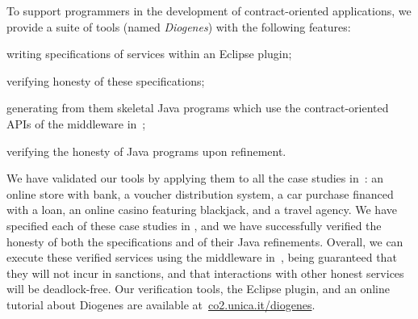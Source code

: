 To support programmers in the development of contract-oriented 
applications, we provide a suite of tools (named \emph{Diogenes}) 
with the following features:
\begin{inlinelist}
\item writing \coco specifications of services within an Eclipse plugin;
\item verifying honesty of these specifications;
\item generating from them skeletal Java programs which
use the contract-oriented APIs of the middleware in~\cite{CO2middleware}; %
\item verifying the honesty of Java programs upon refinement.
\end{inlinelist}
We have validated our tools by applying them to
all the case studies in~\cite{BMSZ15jlamp}:
an online store with bank,
a voucher distribution system,
a car purchase financed with a loan,
an online casino featuring blackjack,
and a travel agency.
We have specified each of these case studies in \coco,
and we have successfully verified the honesty of 
both the specifications and of their Java refinements.
Overall, we can execute these verified services 
using the middleware in~\cite{CO2middleware},
being guaranteed that they will not incur in sanctions,
and that interactions with other honest services will be deadlock-free.
Our verification tools, the Eclipse plugin, and an online tutorial about Diogenes
are available at~\url{co2.unica.it/diogenes}.








\endinput 
In \coco we formalize services 
as processes that can advertise contracts with the $\tell{}{}$ primitive,
and realize them with the $\fact{}{}$ primitive. %

